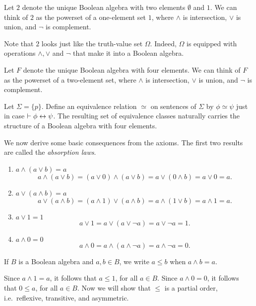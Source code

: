 \begin{example} Let $2$ denote the unique Boolean algebra with two
  elements $\emptyset$ and $1$.  We can think of $2$ as the powerset
  of a one-element set $1$, where $\wedge$ is intersection, $\vee$ is
  union, and $\neg$ is complement.  

  Note that $2$ looks just like the truth-value set $\Omega$.  Indeed,
  $\Omega$ is equipped with operations $\wedge ,\vee$ and $\neg$ that
  make it into a Boolean algebra.  \end{example}

\begin{example} Let $F$ denote the unique Boolean algebra with four
  elements.  We can think of $F$ as the powerset of a two-element set,
  where $\wedge$ is intersection, $\vee$ is union, and $\neg$ is
  complement.  

  Let $\Sigma = \{ p\}$.  Define an equivalence relation $\simeq$ on
  sentences of $\Sigma$ by $\phi\simeq\psi$ just in case $\vdash
  \phi\leftrightarrow\psi$.  The resulting set of equivalence classes naturally
  carries the structure of a Boolean algebra with four
  elements.  \end{example}



We now derive some basic consequences from the axioms.  The first two
results are called the \emph{absorption laws}.
\begin{enumerate}
\item $a\wedge (a\vee b) = a$ \\
  \[ a\wedge (a\vee b)=(a\vee 0)\wedge (a\vee b)=a\vee (0\wedge
  b)=a\vee 0=a .\]
\item $a\vee (a\wedge b)=a$ \\
\[ a\vee (a\wedge b)=(a\wedge 1)\vee (a\wedge b) = a\wedge (1\vee b)
=a\wedge 1=a . \]
\item $a\vee 1=1$ \\
\[ a\vee 1=a\vee (a\vee \neg a)=a\vee \neg a = 1 . \]
\item $a\wedge 0=0$ \\
\[ a\wedge 0=a\wedge (a\wedge \neg a)=a\wedge\neg a= 0. \] \end{enumerate}

\begin{defn} If $B$ is a Boolean algebra and $a,b\in B$, we write
  $a\leq b$ when $a\wedge b=a$. \end{defn}

Since $a\wedge 1=a$, it follows that $a\leq 1$, for all $a\in B$.
Since $a\wedge 0=0$, it follows that $0\leq a$, for all $a\in B$.  Now
we will show that $\leq$ is a partial order, i.e.\ reflexive,
transitive, and asymmetric.

